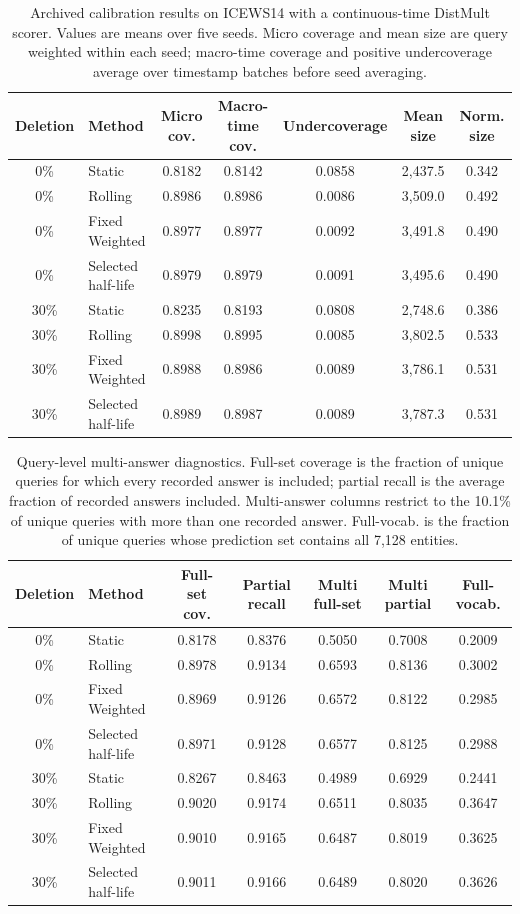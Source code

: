 \documentclass[information,article,submit,oneauthor,pdftex]{Definitions/mdpi}
\begin{document}
\begin{table}[t]
\centering
\caption{Archived calibration results on ICEWS14 with a continuous-time
DistMult scorer. Values are means over five seeds. Micro coverage and mean
size are query weighted within each seed; macro-time coverage and positive
undercoverage average over timestamp batches before seed averaging.}
\label{tab:calibration}
\begin{tabular}{clccccc}
\toprule
Deletion & Method & Micro cov. & Macro-time cov. & Undercoverage & Mean size & Norm. size\\
\midrule
0\% & Static & 0.8182 & 0.8142 & 0.0858 & 2,437.5 & 0.342\\
0\% & Rolling & 0.8986 & 0.8986 & 0.0086 & 3,509.0 & 0.492\\
0\% & Fixed Weighted & 0.8977 & 0.8977 & 0.0092 & 3,491.8 & 0.490\\
0\% & Selected half-life & 0.8979 & 0.8979 & 0.0091 & 3,495.6 & 0.490\\
\midrule
30\% & Static & 0.8235 & 0.8193 & 0.0808 & 2,748.6 & 0.386\\
30\% & Rolling & 0.8998 & 0.8995 & 0.0085 & 3,802.5 & 0.533\\
30\% & Fixed Weighted & 0.8988 & 0.8986 & 0.0089 & 3,786.1 & 0.531\\
30\% & Selected half-life & 0.8989 & 0.8987 & 0.0089 & 3,787.3 & 0.531\\
\bottomrule
\end{tabular}
\end{table}

\begin{table}[t]
\centering
\caption{Query-level multi-answer diagnostics. Full-set coverage is the
fraction of unique queries for which every recorded answer is included; partial
recall is the average fraction of recorded answers included. Multi-answer
columns restrict to the 10.1\% of unique queries with more than one recorded
answer. Full-vocab. is the fraction of unique queries whose prediction set
contains all 7,128 entities.}
\label{tab:query-level}
\footnotesize
\setlength{\tabcolsep}{4pt}
\begin{tabular}{clccccc}
\toprule
Deletion & Method & Full-set cov. & Partial recall & Multi full-set & Multi partial & Full-vocab.\\
\midrule
0\% & Static & 0.8178 & 0.8376 & 0.5050 & 0.7008 & 0.2009\\
0\% & Rolling & 0.8978 & 0.9134 & 0.6593 & 0.8136 & 0.3002\\
0\% & Fixed Weighted & 0.8969 & 0.9126 & 0.6572 & 0.8122 & 0.2985\\
0\% & Selected half-life & 0.8971 & 0.9128 & 0.6577 & 0.8125 & 0.2988\\
\midrule
30\% & Static & 0.8267 & 0.8463 & 0.4989 & 0.6929 & 0.2441\\
30\% & Rolling & 0.9020 & 0.9174 & 0.6511 & 0.8035 & 0.3647\\
30\% & Fixed Weighted & 0.9010 & 0.9165 & 0.6487 & 0.8019 & 0.3625\\
30\% & Selected half-life & 0.9011 & 0.9166 & 0.6489 & 0.8020 & 0.3626\\
\bottomrule
\end{tabular}
\end{table}
\end{document}
